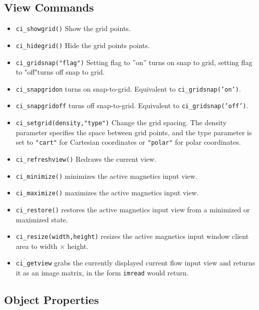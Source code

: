 \subsection{View Commands}
\begin{itemize}
\item \texttt{ci\_showgrid()} Show the grid points.

\item \texttt{ci\_hidegrid()} Hide the grid points points.

\item \texttt{ci\_gridsnap("flag")} Setting flag to ''on'' turns on snap to grid,
setting flag to "off"turns off snap to grid.

\item{\tt ci\_snapgridon} turns on snap-to-grid. Equivalent to {\tt ci\_gridsnap('on')}.

\item{\tt ci\_snapgridoff} turns off snap-to-grid. Equivalent to {\tt ci\_gridsnap('off')}.

\item \texttt{ci\_setgrid(density,"type")} Change the grid spacing. The density
parameter specifies the space between grid points, and the type
parameter is set to \texttt{"cart"} for Cartesian coordinates or
\texttt{"polar"} for polar coordinates.

\item \texttt{ci\_refreshview()} Redraws the current view.

\item{\tt ci\_minimize()} minimizes the active magnetics input view.

\item{\tt ci\_maximize()} maximizes the active magnetics input view.

\item{\tt ci\_restore()} restores the active magnetics input view from a
 minimized or maximized state.

\item{\tt ci\_resize(width,height)} resizes the active magnetics input
 window client area to width $\times$ height.
\item{\tt ci\_getview} grabs the currently displayed current flow input view and
 returns it as an image matrix, in the form \texttt{imread} would return.

\end{itemize}




\subsection{Object Properties}

